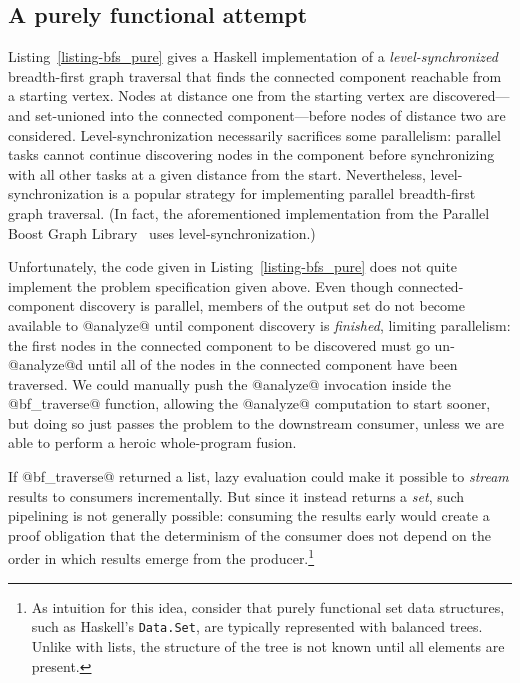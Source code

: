 \subsection{A purely functional attempt}

\singlespacing

\doublespacing

Listing~\ref{listing-bfs_pure} gives a Haskell implementation of a
\emph{level-synchronized} breadth-first graph traversal that finds the
connected component reachable from a starting vertex.  Nodes at
distance one from the starting vertex are discovered---and set-unioned
into the connected component---before nodes of distance two are
considered.  Level-synchronization necessarily sacrifices some
parallelism: parallel tasks cannot continue discovering nodes in the
component before synchronizing with all other tasks at a given
distance from the start.  Nevertheless, level-synchronization is a
popular strategy for implementing parallel breadth-first graph
traversal.  (In fact, the aforementioned implementation from the
Parallel Boost Graph Library~ uses
level-synchronization.)

Unfortunately, the code given in Listing~\ref{listing-bfs_pure} does
not quite implement the problem specification given above.  Even
though connected-component discovery is parallel, members of the
output set do not become available to @analyze@ until component
discovery is \emph{finished}, limiting parallelism: the first nodes in
the connected component to be discovered must go un-@analyze@d until
all of the nodes in the connected component have been traversed.  We
could manually push the @analyze@ invocation inside the @bf_traverse@
function, allowing the @analyze@ computation to start sooner, but
doing so just passes the problem to the downstream consumer, unless we
are able to perform a heroic whole-program fusion.

If @bf_traverse@ returned a list, lazy evaluation could make it
possible to \emph{stream} results to consumers incrementally.  But
since it instead returns a \emph{set}, such pipelining is not
generally possible: consuming the results early would create a proof
obligation that the determinism of the consumer does not depend on the
order in which results emerge from the producer.\footnote{As intuition
  for this idea, consider that purely functional set data structures,
  such as Haskell's \lstinline|Data.Set|, are typically represented
  with balanced trees.  Unlike with lists, the structure of the tree
  is not known until all elements are present.}

